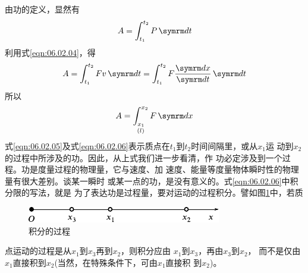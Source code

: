 由功的定义，显然有
\begin{equation}\label{eqn:06.02.05}
  A = \int _ { t _ { 1 } } ^ { t _ { 2 } } P \dif t
\end{equation}
利用式\eqref{eqn:06.02.04}，得
\begin{equation*}
  A = \int _ { t _ { 1 } } ^ { t _ { 2 } } F v \dif t = \int _ { t _ { 1 } } ^ { t_ { 2 } } F \frac { \dif x } { \dif t } \dif t
\end{equation*}
所以\vspace{-1.56em}
\begin{equation}\label{eqn:06.02.06}
  A = \mathop{\int _ { x _ { 1 } } ^ { x _ { 2 } }}\limits _ { ( l ) } F \dif x
\end{equation}
式\eqref{eqn:06.02.05}及式\eqref{eqn:06.02.06}表示质点在$ t_1 $到$ t_2 $时间间隔里，或从$ x_1 $运
动到$ x_2 $的过程中所涉及的功。因此，从上式我们进一步看清，作
功必定涉及到一个过程。功是度量过程的物理量，它与速度、加
速度、能量等度量物体瞬时性的物理量有很大差别。谈某一瞬时
或某一点的功，是没有意义的。式\eqref{eqn:06.02.06}中积分限的写法，就是
为了表达功是过程量，要对运动的过程积分。譬如图\ref{fig:06.05}\;中，若质
\begin{figure}
  \centering
  \includegraphics{figure/fig06.05}
  \caption{积分的过程}
  \label{fig:06.05}
\end{figure}
点运动的过程是从$ x_1 $到$ x_3 $再到$ x_2 $，则积分应由
$ x_1 $到$ x_3 $，再由$ x_3 $到$ x_2 $，
而不是仅由$ x_1 $直接积到$ x_2 $(当然，在特殊条件下，可由$ x_1 $直接积
到$ x_2 $)。


